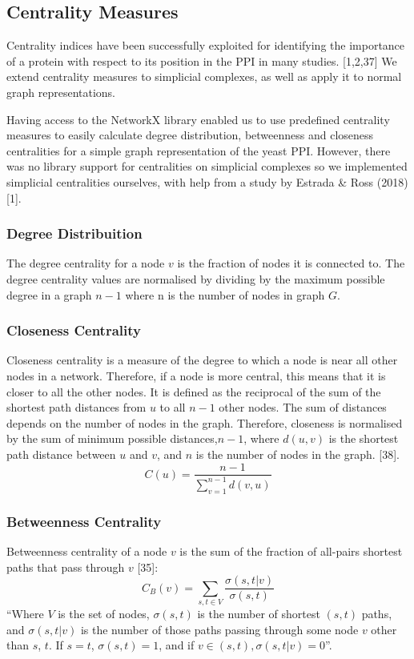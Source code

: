 \documentclass[9pt]{article}
\begin{document}
\subsection{Centrality Measures}
Centrality indices have been successfully exploited for identifying the importance of a protein with respect to its position in the PPI in many studies. [1,2,37] We extend centrality measures to simplicial complexes, as well as apply it to normal graph representations.

Having access to the NetworkX library enabled us to use predefined centrality measures to easily calculate degree distribution, betweenness and closeness centralities for a simple graph representation of the yeast PPI. However, there was no library support for centralities on simplicial complexes so we implemented simplicial centralities ourselves, with help from a study by Estrada \& Ross (2018) [1].

\subsubsection{Degree Distribuition}
The degree centrality for a node \(v\) is the fraction of nodes it is connected to. The degree centrality values are normalised by dividing by the maximum possible degree in a graph \(n-1\) where n is the number of nodes in graph \(G\).

\subsubsection{Closeness Centrality} 
Closeness centrality is a measure of the degree to which a node is near all other nodes in a network. Therefore, if a node is more central, this means that it is closer to all the other nodes. It is defined as the reciprocal of the sum of the shortest path distances from \(u\) to all \(n-1\) other nodes. The sum of distances depends on the number of nodes in the graph. Therefore, closeness is normalised by the sum of minimum possible distances,\( n-1\), where \(d(u,v)\) is the shortest path distance between \(u\) and \(v\), and \(n\) is the number of nodes in the graph. [38].
\begin{equation}
C(u)=\frac{n-1}{\sum_{v=1}^{n-1} d(v,u)}
\end{equation}

\subsubsection{Betweenness Centrality}
Betweenness centrality of a node \(v\) is the sum of the fraction of all-pairs shortest paths that pass through \(v\) [35]:
\begin{equation}
C_B(v)=\sum_{s,t\in{V}}\frac{\sigma(s, t|v)}{\sigma(s, t)}
\end{equation}
“Where \(V\) is the set of nodes, \(\sigma(s, t)\) is the number of shortest \((s, t)\) paths, and \(\sigma(s, t|v)\) is the number of those paths passing through some node \(v\) other than \(s\), \(t\). If \(s = t\), \(\sigma(s, t) = 1\), and if \(v \in (s, t), \sigma(s, t|v) = 0\)”.
\end{document}
